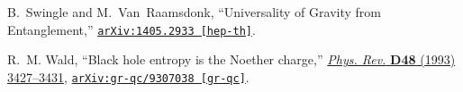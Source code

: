 \begin{thebibliography}{100}
B.~Swingle and M.~Van~Raamsdonk, ``{Universality of Gravity from
  Entanglement},''
\href{http://arxiv.org/abs/1405.2933}{{\tt arXiv:1405.2933 [hep-th]}}.

R.~M. Wald, ``{Black hole entropy is the Noether charge},''
  \href{http://dx.doi.org/10.1103/PhysRevD.48.R3427}{{\em Phys. Rev.} {\bf D48}
  (1993)  3427--3431},
\href{http://arxiv.org/abs/gr-qc/9307038}{{\tt arXiv:gr-qc/9307038 [gr-qc]}}.

\end{thebibliography}\endgroup
